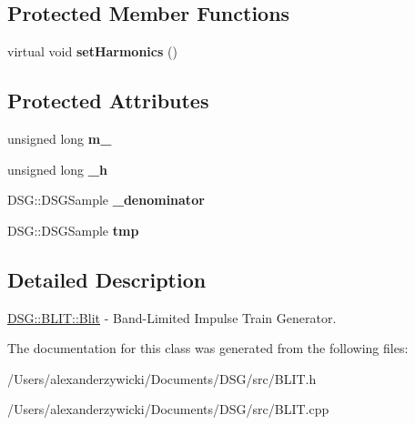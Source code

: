 \subsection*{Protected Member Functions}
\begin{DoxyCompactItemize}
\item 
\hypertarget{class_d_s_g_1_1_b_l_i_t_1_1_blit_a1241643aad0450f673fe868a9c8e6b2f}{virtual void {\bfseries set\+Harmonics} ()}\label{class_d_s_g_1_1_b_l_i_t_1_1_blit_a1241643aad0450f673fe868a9c8e6b2f}

\end{DoxyCompactItemize}
\subsection*{Protected Attributes}
\begin{DoxyCompactItemize}
\item 
\hypertarget{class_d_s_g_1_1_b_l_i_t_1_1_blit_afa6e4d46efdbfa032762610601ed42a0}{unsigned long {\bfseries m\+\_\+}}\label{class_d_s_g_1_1_b_l_i_t_1_1_blit_afa6e4d46efdbfa032762610601ed42a0}

\item 
\hypertarget{class_d_s_g_1_1_b_l_i_t_1_1_blit_a632c6f070187969b90c70b65668b82bc}{unsigned long {\bfseries \+\_\+h}}\label{class_d_s_g_1_1_b_l_i_t_1_1_blit_a632c6f070187969b90c70b65668b82bc}

\item 
\hypertarget{class_d_s_g_1_1_b_l_i_t_1_1_blit_a85747e4c3a9836779c50575351a278fa}{D\+S\+G\+::\+D\+S\+G\+Sample {\bfseries \+\_\+denominator}}\label{class_d_s_g_1_1_b_l_i_t_1_1_blit_a85747e4c3a9836779c50575351a278fa}

\item 
\hypertarget{class_d_s_g_1_1_b_l_i_t_1_1_blit_a023c198ed83ec795e80cc9d4e4f3660e}{D\+S\+G\+::\+D\+S\+G\+Sample {\bfseries tmp}}\label{class_d_s_g_1_1_b_l_i_t_1_1_blit_a023c198ed83ec795e80cc9d4e4f3660e}

\end{DoxyCompactItemize}


\subsection{Detailed Description}
\hyperlink{class_d_s_g_1_1_b_l_i_t_1_1_blit}{D\+S\+G\+::\+B\+L\+I\+T\+::\+Blit} -\/ Band-\/\+Limited Impulse Train Generator. 

The documentation for this class was generated from the following files\+:\begin{DoxyCompactItemize}
\item 
/\+Users/alexanderzywicki/\+Documents/\+D\+S\+G/src/B\+L\+I\+T.\+h\item 
/\+Users/alexanderzywicki/\+Documents/\+D\+S\+G/src/B\+L\+I\+T.\+cpp\end{DoxyCompactItemize}
